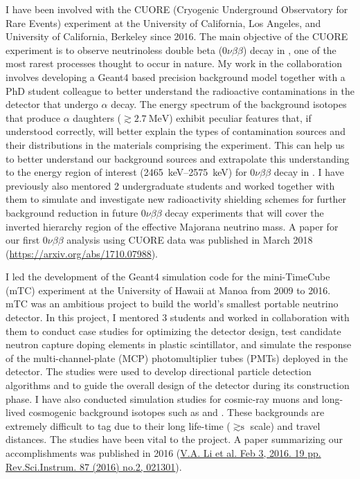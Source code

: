 \documentclass[11pt]{article} %
\begin{document}
I have been involved with the CUORE (Cryogenic Underground Observatory for Rare
Events) experiment at the University of California, Los Angeles, and University
of California, Berkeley since 2016. The main objective of the CUORE experiment
is to observe neutrinoless double beta ($0\nu\beta\beta$) decay in
, one of the most rarest processes thought to occur in nature. My
work in the collaboration involves developing a Geant4 based precision
background model together with a PhD student colleague to better understand the
radioactive contaminations in the detector that undergo $\alpha$ decay. The
energy spectrum of the background isotopes that produce $\alpha$ daughters
($\gtrsim \SI{2.7}{\mega\electronvolt}$) exhibit peculiar features that, if
understood correctly, will better explain the types of contamination sources
and their distributions in the materials comprising the experiment. This can
help us to better understand our background sources and extrapolate this
understanding to the energy region of interest
(\SIrange{2465}{2575}{\kilo\electronvolt}) for $0\nu\beta\beta$ decay in
. I have previously also mentored 2 undergraduate students and
worked together with them to simulate and investigate new radioactivity
shielding schemes for further background reduction in future $0\nu\beta\beta$
decay experiments that will cover the inverted hierarchy region of the
effective Majorana neutrino mass. A paper for our first $0\nu\beta\beta$
analysis using CUORE data was published in March 2018
(\href{https://arxiv.org/abs/1710.07988}{https://arxiv.org/abs/1710.07988}).

I led the development of the Geant4 simulation code for the
mini-TimeCube (mTC) experiment at the University of Hawaii at Manoa from 2009
to 2016. mTC was an ambitious project to build the world's smallest portable
neutrino detector. In this project, I mentored 3 students and worked in
collaboration with them to conduct case studies for optimizing the detector
design, test candidate neutron capture doping elements in plastic scintillator,
and simulate the response of the multi-channel-plate (MCP) photomultiplier
tubes (PMTs) deployed in the detector. The studies were used to develop
directional particle detection algorithms and to guide the overall design of the
detector during its construction phase. I have also conducted simulation
studies for cosmic-ray muons and long-lived cosmogenic background isotopes such
as  and . These backgrounds are extremely difficult to
tag due to their long life-time ($\gtrsim \si{\second}$ scale) and travel
distances. The studies have been vital to the project. A paper summarizing our
accomplishments was published in 2016
(\href{https://arxiv.org/abs/1602.01405}{V.A. Li et al. Feb 3, 2016. 19 pp.
Rev.Sci.Instrum. 87 (2016) no.2, 021301}).
\end{document}
